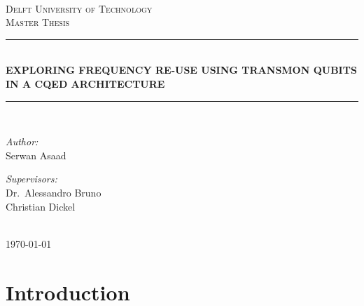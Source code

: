 \documentclass[12pt]{report}
\newcommand{\HRule}[1]{\rule{\linewidth}{#1}}
\begin{document}
\begin{titlepage}
\begin{center}
~\\ [4.0 cm]
\textsc{\LARGE Delft University of Technology}
\\ [3.0 cm]
\textsc{\Large Master Thesis}
\HRule{0.5 pt} \\
\LARGE \textbf{\uppercase{Exploring frequency re-use using transmon qubits in a cQED architecture}}
\HRule{2 pt} \\ [0.5 cm]

\noindent
\begin{minipage}{0.4\textwidth}
\begin{flushleft} \large
\emph{Author:}\\
Serwan Asaad
\end{flushleft}
\end{minipage}%
\begin{minipage}{0.4\textwidth}
\begin{flushright} \large
\emph{Supervisors:} \\
Dr.~Alessandro Bruno \\
Christian Dickel
\end{flushright}
\end{minipage}
\\ [3.0 cm]
{\large \today}
\end{center}

\end{titlepage}


\author{
    Serwan Asaad
    Student ID: 4323475 \\
    Delft University of Technology \\
    Kavli Institute of Nanoscience\\
    Quantum Nanoscience Department\\
    Quantum Transport Group\\
    DiCarlo Lab}

\tableofcontents
\newpage

\sectionfont{\scshape}


\chapter{Introduction}
\end{document}
